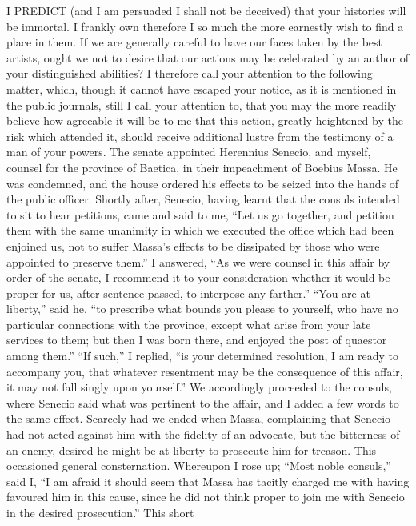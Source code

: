 
I PREDICT (and I am persuaded I shall not be deceived) that your histories
will be immortal. I frankly own therefore I so much the more earnestly
wish to find a place in them. If we are generally careful to have our
faces taken by the best artists, ought we not to desire that our actions
may be celebrated by an author of your distinguished abilities? I
therefore call your attention to the following matter, which, though it
cannot have escaped your notice, as it is mentioned in the public
journals, still I call your attention to, that you may the more readily
believe how agreeable it will be to me that this action, greatly
heightened by the risk which attended it, should receive additional lustre
from the testimony of a man of your powers. The senate appointed Herennius
Senecio, and myself, counsel for the province of Baetica, in their
impeachment of Boebius Massa. He was condemned, and the house ordered his
effects to be seized into the hands of the public officer. Shortly after,
Senecio, having learnt that the consuls intended to sit to hear petitions,
came and said to me, ``Let us go together, and petition them with the same
unanimity in which we executed the office which had been enjoined us, not
to suffer Massa's effects to be dissipated by those who were appointed to
preserve them.'' I answered, ``As we were counsel in this affair by order of
the senate, I recommend it to your consideration whether it would be
proper for us, after sentence passed, to interpose any farther.'' ``You are
at liberty,'' said he, ``to prescribe what bounds you please to yourself,
who have no particular connections with the province, except what arise
from your late services to them; but then I was born there, and enjoyed
the post of quaestor among them.'' ``If such,'' I replied, ``is your
determined resolution, I am ready to accompany you, that whatever
resentment may be the consequence of this affair, it may not fall singly
upon yourself.'' We accordingly proceeded to the consuls, where Senecio
said what was pertinent to the affair, and I added a few words to the same
effect. Scarcely had we ended when Massa, complaining that Senecio had not
acted against him with the fidelity of an advocate, but the bitterness of
an enemy, desired he might be at liberty to prosecute him for treason.
This occasioned general consternation. Whereupon I rose up; ``Most noble
consuls,'' said I, ``I am afraid it should seem that Massa has tacitly
charged me with having favoured him in this cause, since he did not think
proper to join me with Senecio in the desired prosecution.'' This short
